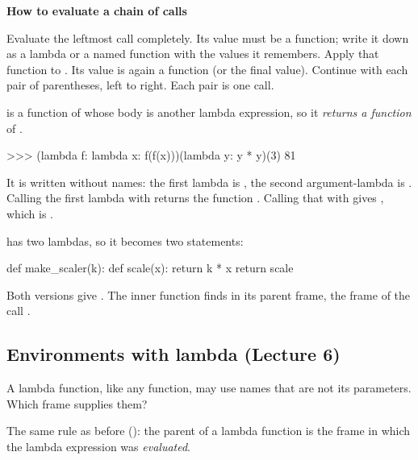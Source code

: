 \documentclass[10pt]{scrartcl}
\newenvironment{howto}[1]{\begin{mdframed}[style=howtostyle]{\color{NavyBlue}\textbf{#1}}\par\vspace{2pt}}{\end{mdframed}}
\begin{document}
\begin{howto}{How to evaluate a chain of calls }
\begin{steps}
  \ii Evaluate the leftmost call  completely. Its value must be a function; write it down as a lambda or a named function with the values it remembers.
  \ii Apply that function to . Its value is again a function (or the final value).
  \ii Continue with each pair of parentheses, left to right. Each pair is one call.
\end{steps}
\end{howto}

\begin{example*}
 is a function of  whose body is another lambda expression, so it \emph{returns a function} of .
\begin{py}
>>> (lambda f: lambda x: f(f(x)))(lambda y: y * y)(3)
81
\end{py}
\begin{steps}
  \ii It is  written without names: the first lambda is , the second argument-lambda is .
  \ii Calling the first lambda with  returns the function .
  \ii Calling that with  gives , which is .
\end{steps}
\end{example*}

\begin{example*}
 has two lambdas, so it becomes two  statements:
\begin{py}
def make_scaler(k):
    def scale(x):
        return k * x
    return scale
\end{py}
Both versions give . The inner function finds  in its parent frame, the frame of the call .
\end{example*}

\subsection{Environments with lambda (Lecture 6)}
\begin{qbox}
  A lambda function, like any function, may use names that are not its parameters. Which frame supplies them?
\end{qbox}
The same rule as before (): the parent of a lambda function is the frame in which the lambda expression was \emph{evaluated}.
\end{document}
